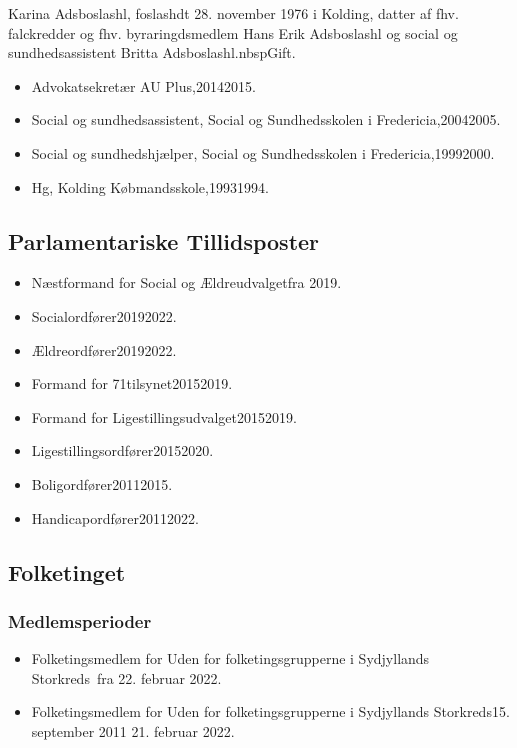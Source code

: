 \documentclass[11pt, a4paper]{awesome-cv}
\begin{document}
\makecvheader[R]
\makelettertitle
\begin{cvletter}
Karina Adsboslashl, foslashdt 28. november 1976 i Kolding, datter af fhv. falckredder og fhv. byraringdsmedlem Hans Erik Adsboslashl og social og sundhedsassistent Britta Adsboslashl.nbspGift.

\begin{itemize}
\item Advokatsekretær AU Plus,20142015.
\item Social og sundhedsassistent, Social og Sundhedsskolen i Fredericia,20042005.
\item Social og sundhedshjælper, Social og Sundhedsskolen i Fredericia,19992000.
\item Hg, Kolding Købmandsskole,19931994.
\end{itemize}
\subsection*{Parlamentariske Tillidsposter}
\begin{itemize}
\item Næstformand for Social og Ældreudvalgetfra 2019.
\item Socialordfører20192022.
\item Ældreordfører20192022.
\item Formand for  71tilsynet20152019.
\item Formand for Ligestillingsudvalget20152019.
\item Ligestillingsordfører20152020.
\item Boligordfører20112015.
\item Handicapordfører20112022.
\end{itemize}
\subsection*{Folketinget}
\subsubsection*{Medlemsperioder}
\begin{itemize}
\item Folketingsmedlem for Uden for folketingsgrupperne i Sydjyllands Storkreds fra 22. februar 2022.
\item Folketingsmedlem for Uden for folketingsgrupperne i Sydjyllands Storkreds15. september 2011  21. februar 2022.
\end{itemize}

\end{cvletter}
\end{document}

